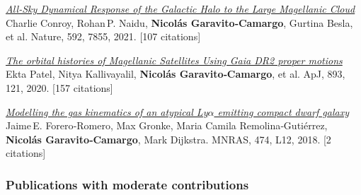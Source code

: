 \documentclass[14pt]{article}
\begin{document}
\begin{etaremune}
\item \textit{\href{https://ui.adsabs.harvard.edu/abs/2021Natur.592..XXXC/abstract}{All‑Sky Dynamical Response of the Galactic Halo to the Large Magellanic Cloud}}\\
{ \small \color{darkgray} Charlie Conroy, Rohan P. Naidu, \textbf{Nicol\'as Garavito‑Camargo}, Gurtina Besla, et al. Nature, 592, 7855, 2021. [107 citations]}

\item \textit{\href{https://ui.adsabs.harvard.edu/abs/2020ApJ...893..121P/abstract}{The orbital histories of Magellanic Satellites Using Gaia DR2 proper motions}}\\
{ \small \color{darkgray} Ekta Patel, Nitya Kallivayalil, \textbf{Nicol\'as Garavito‑Camargo}, et al. ApJ, 893, 121, 2020. [157 citations]}

\item \textit{\href{https://ui.adsabs.harvard.edu/abs/2018MNRAS.474L..12F/abstract}{Modelling the gas kinematics of an atypical Ly$\alpha$ emitting compact dwarf galaxy}}\\
{ \small \color{darkgray} Jaime E. Forero‑Romero, Max Gronke, Maria Camila Remolina‑Gutiérrez, \textbf{Nicol\'as Garavito‑Camargo}, Mark Dijkstra. MNRAS, 474, L12, 2018. [2 citations]}

\end{etaremune}


\subsubsection*{Publications with moderate contributions}
\end{document}
